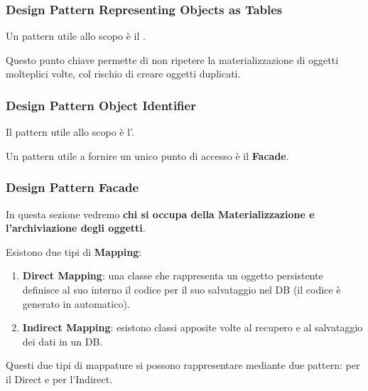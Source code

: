 {    \subsubsection{Design Pattern Representing Objects as Tables}
    Un pattern utile allo scopo è il .
    

    Questo punto chiave permette di non ripetere la materializzazione di oggetti molteplici volte, col rischio di creare oggetti
    duplicati.

    \subsubsection{Design Pattern Object Identifier}
    Il pattern utile allo scopo è l'.
    

    \newpage
    Un pattern utile a fornire un unico punto di accesso è il \textbf{Facade}.
    \subsubsection{Design Pattern Facade}
    

    In questa sezione vedremo \textbf{chi si occupa della Materializzazione e \\l'archiviazione degli oggetti}.

    Esistono due tipi di \textbf{Mapping}:
    \begin{enumerate}
        \item \textbf{Direct Mapping}: una classe che rappresenta un oggetto persistente \\definisce al suo interno il codice
              per il suo salvataggio nel DB (il codice è generato in automatico).
        \item \textbf{Indirect Mapping}: esistono classi apposite volte al recupero e al salvataggio dei dati in un DB.
    \end{enumerate}

    Questi due tipi di mappature si possono rappresentare mediante due pattern:  per il Direct e 
    per l'Indirect.

}
